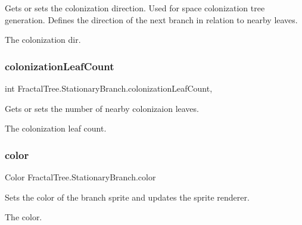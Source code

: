 Gets or sets the colonization direction. Used for space colonization tree generation. Defines the direction of the next branch in relation to nearby leaves. 

The colonization dir.\hypertarget{class_fractal_tree_1_1_stationary_branch_a8b1373ac7c9a1445f3670c6f8539b431}{}\label{class_fractal_tree_1_1_stationary_branch_a8b1373ac7c9a1445f3670c6f8539b431} 
\subsubsection{\texorpdfstring{colonization\+Leaf\+Count}{colonizationLeafCount}}
{\footnotesize\ttfamily int Fractal\+Tree.\+Stationary\+Branch.\+colonization\+Leaf\+Count\hspace{0.3cm}{\ttfamily [get]}, {\ttfamily [set]}}



Gets or sets the number of nearby colonizaion leaves. 

The colonization leaf count.\hypertarget{class_fractal_tree_1_1_stationary_branch_a265ca67d50299986adb192386fc7b932}{}\label{class_fractal_tree_1_1_stationary_branch_a265ca67d50299986adb192386fc7b932} 
\subsubsection{\texorpdfstring{color}{color}}
{\footnotesize\ttfamily Color Fractal\+Tree.\+Stationary\+Branch.\+color\hspace{0.3cm}{\ttfamily [set]}}



Sets the color of the branch sprite and updates the sprite renderer. 

The color.\hypertarget{class_fractal_tree_1_1_stationary_branch_a0119dcc7bb419191c909cd1ae2f04f34}{}\label{class_fractal_tree_1_1_stationary_branch_a0119dcc7bb419191c909cd1ae2f04f34} 
